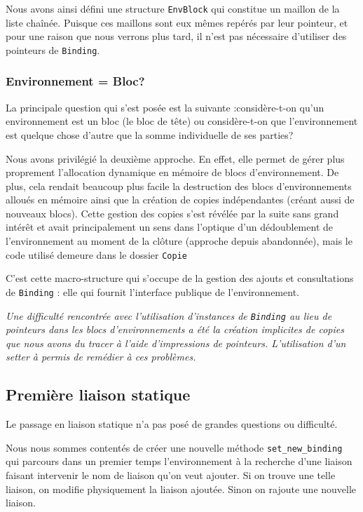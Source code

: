 \documentclass[a4paper,11pt]{article}
\newcommand{\dbend}{{\manual\char127}}
\newenvironment{attention}%
{\description\item[\dbend]\sl}%
{\enddescription}
\begin{document}
Nous avons ainsi défini une structure \texttt{EnvBlock} qui constitue un maillon
de la liste chaînée. Puisque ces maillons sont eux mêmes repérés par leur
pointeur, et pour une raison que nous verrons plus tard, il n'est pas nécessaire
d'utiliser des pointeurs de \texttt{Binding}.

\subsubsection{Environnement = Bloc?}

La principale question qui s'est posée est la suivante :considère-t-on qu'un
environnement est un bloc (le bloc de \og tête\fg) ou considère-t-on que
l'environnement est quelque chose d'autre que la somme individuelle de ses
parties?

Nous avons privilégié la deuxième approche. En effet, elle permet de gérer plus
proprement l'allocation dynamique en mémoire de blocs d'environnement. De plus,
cela rendait beaucoup plus facile la destruction des blocs d'environnements
alloués en mémoire ainsi que la création de copies indépendantes (créant aussi
de nouveaux blocs). Cette gestion des copies s'est révélée par la suite sans
grand intérêt et avait principalement un sens dans l'optique d'un dédoublement
de l'environnement au moment de la clôture (approche depuis abandonnée), mais le code utilisé demeure dans le dossier \texttt{Copie}

C'est cette macro-structure qui s'occupe de la gestion des ajouts et
consultations de \texttt{Binding} : elle qui fournit l'interface publique
de l'environnement.

\begin{attention}
  Une difficulté rencontrée avec l'utilisation d'instances de \texttt{Binding}
  au lieu de pointeurs dans les blocs d'environnements a été la création
  implicites de copies que nous avons du tracer à l'aide d'impressions de
  pointeurs. L'utilisation d'un setter à permis de remédier à ces problèmes.
\end{attention}

\subsection{Première liaison statique}

Le passage en liaison statique n'a pas posé de grandes questions ou difficulté.

Nous nous sommes contentés de créer une nouvelle méthode
\texttt{set\_new\_binding} qui parcours dans un premier temps l'environnement à la
recherche d'une liaison faisant intervenir le nom de liaison qu'on veut ajouter.
Si on trouve une telle liaison, on modifie physiquement la liaison ajoutée.
Sinon on rajoute une nouvelle liaison.
\end{document}
